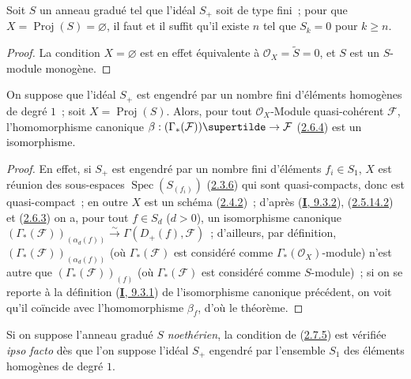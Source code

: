 \begin{corollary}[2.7.4]
\label{II.2.7.4-fr}
Soit $S$ un anneau gradué tel que l'idéal $S_+$ soit de type fini~; pour que
$X=\operatorname{Proj}(S)=\varnothing$, il faut et il suffit qu'il existe $n$
tel que $S_k=0$ pour $k\geq n$.
\end{corollary}

\begin{proof}
La condition $X=\varnothing$ est en effet équivalente à
$\mathcal{O}_X=\widetilde{S}=0$, et $S$ est un $S$-module monogène.
\end{proof}

\begin{theorem}[2.7.5]
\label{II.2.7.5-fr}
On suppose que l'idéal $S_+$ est engendré par un nombre fini d'éléments
homogènes de degré $1$~; soit $X=\operatorname{Proj}(S)$. Alors, pour tout
$\mathcal{O}_X$-Module quasi-cohérent $\mathcal{F}$, l'homomorphisme
canonique $\beta:(\Gamma_*(\mathcal{F}))\supertilde
\to\mathcal{F}$ \textup{(\hyperref[II.2.6.4-fr]{2.6.4})} est un isomorphisme.
\end{theorem}

\begin{proof}
En effet, si $S_+$ est engendré par un nombre fini d'éléments $f_i\in S_1$,
$X$ est réunion des sous-espaces $\operatorname{Spec}(S_{(f_i)})$
(\hyperref[II.2.3.6-fr]{2.3.6}) qui sont quasi-compacts, donc est
quasi-compact~; en outre $X$ est un schéma
(\hyperref[II.2.4.2-fr]{2.4.2})~; d'après
(\hyperref[I.9.3.2-fr]{\textbf{I}, 9.3.2}),
(\hyperref[II.2.5.14.2-fr]{2.5.14.2}) et
(\hyperref[II.2.6.3-fr]{2.6.3}) on a, pour tout $f\in S_d$ ($d>0$), un
isomorphisme canonique
$(\Gamma_*(\mathcal{F}))_{(\alpha_d(f))}\xrightarrow{\sim}
\Gamma(D_+(f),\mathcal{F})$~; d'ailleurs, par définition,
$(\Gamma_*(\mathcal{F}))_{(\alpha_d(f))}$ (où $\Gamma_*(\mathcal{F})$ est
considéré comme $\Gamma_*(\mathcal{O}_X)$-module) n'est autre que
$(\Gamma_*(\mathcal{F}))_{(f)}$ (où $\Gamma_*(\mathcal{F})$ est considéré
comme $S$-module)~; si on se reporte à la définition
(\hyperref[I.9.3.1-fr]{\textbf{I}, 9.3.1}) de l'isomorphisme canonique précédent, on
voit qu'il coïncide avec l'homomorphisme $\beta_f$, d'où le théorème.
\end{proof}

\begin{remark}[2.7.6]
\label{II.2.7.6-fr}
Si on suppose l'anneau gradué $S$ \emph{noethérien}, la condition de
(\hyperref[II.2.7.5-fr]{2.7.5}) est vérifiée \emph{ipso facto} dès que l'on
suppose l'idéal $S_+$ engendré par l'ensemble $S_1$ des éléments homogènes de
degré $1$.
\end{remark}

